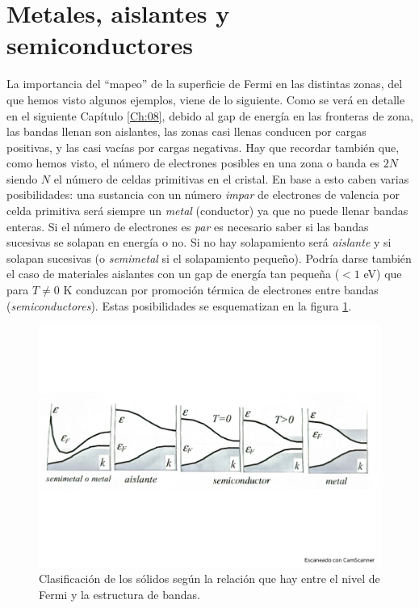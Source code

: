 \section{Metales, aislantes y semiconductores}

La importancia del ``mapeo'' de la superficie de Fermi en las distintas zonas, del que hemos visto algunos ejemplos, viene de lo siguiente. Como se verá en detalle en el siguiente Capítulo \ref{Ch:08}, debido al gap de energía en las fronteras de zona, las bandas llenan son aislantes, las zonas casi llenas conducen por cargas positivas, y las casi vacías por cargas negativas. Hay que recordar también que, como hemos visto, el número de electrones posibles en una zona o banda es $2N$ siendo $N$ el número de celdas primitivas en el cristal. En base a esto caben varias posibilidades: una sustancia con un número \textit{impar} de electrones de valencia por celda primitiva será siempre un \textit{metal} (conductor) ya que no puede llenar bandas enteras. Si el número de electrones es \textit{par} es necesario saber si las bandas sucesivas se solapan en energía o no. Si no hay solapamiento será \textit{aislante} y si solapan sucesivas (o \textit{semimetal} si el solapamiento pequeño). Podría darse también el caso de materiales aislantes con un gap de energía tan pequeña ($<1$ eV) que para $T\neq 0$ K conduzcan por promoción térmica de electrones entre bandas (\textit{semiconductores}). Estas posibilidades se esquematizan en la figura \ref{Fig:07-10}.

\begin{figure}[h!] \centering
	\includegraphics[scale=0.5]{Cuerpo/Ch_07/Fotos libro 10.pdf}
	\caption{Clasificación de los sólidos según la relación que hay entre el nivel de Fermi y la estructura de bandas.}
	\label{Fig:07-10}
\end{figure}    




